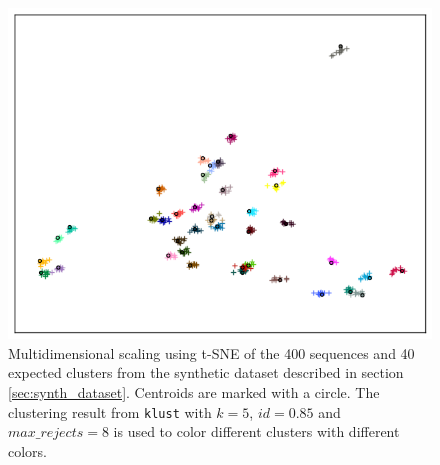 \begin{figure}[H]
  \includegraphics[width=\textwidth]{graphics/MDS_t-SNE_synth_silva_400.png}
  \caption{Multidimensional scaling using t-SNE of the 400 sequences and
    40 expected clusters from the synthetic dataset described in section
    \ref{sec:synth_dataset}. Centroids are marked with a circle. The clustering
    result from \texttt{klust} with $k=5$, $id=0.85$ and $max\_rejects=8$ is
    used to color different clusters with different colors.}
  \label{fig:mds_synth}
\end{figure}

